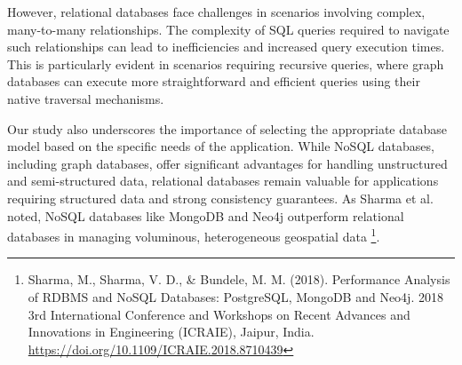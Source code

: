 However, relational databases face challenges in scenarios involving complex, many-to-many relationships. The complexity of SQL queries required to navigate such relationships can lead to inefficiencies and increased query execution times. This is particularly evident in scenarios requiring recursive queries, where graph databases can execute more straightforward and efficient queries using their native traversal mechanisms.

Our study also underscores the importance of selecting the appropriate database model based on the specific needs of the application. While NoSQL databases, including graph databases, offer significant advantages for handling unstructured and semi-structured data, relational databases remain valuable for applications requiring structured data and strong consistency guarantees. As Sharma et al. noted, NoSQL databases like MongoDB and Neo4j outperform relational databases in managing voluminous, heterogeneous geospatial data \footnote{Sharma, M., Sharma, V. D., \& Bundele, M. M. (2018). Performance Analysis of RDBMS and NoSQL Databases: PostgreSQL, MongoDB and Neo4j. 2018 3rd International Conference and Workshops on Recent Advances and Innovations in Engineering (ICRAIE), Jaipur, India. \url{https://doi.org/10.1109/ICRAIE.2018.8710439}}.